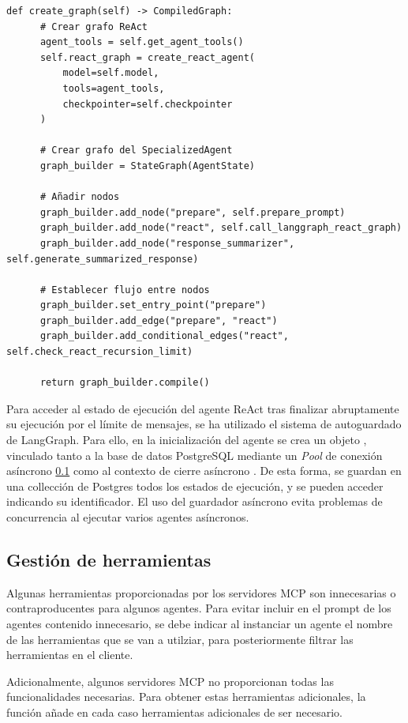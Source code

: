 \begin{lstlisting}[caption={\protect\opus{create_graph: Grafo de agentes especializados} },label={lst:spec_graph}]
  def create_graph(self) -> CompiledGraph:
      # Crear grafo ReAct
      agent_tools = self.get_agent_tools()
      self.react_graph = create_react_agent(
          model=self.model,
          tools=agent_tools,
          checkpointer=self.checkpointer
      )

      # Crear grafo del SpecializedAgent
      graph_builder = StateGraph(AgentState)

      # Añadir nodos 
      graph_builder.add_node("prepare", self.prepare_prompt)
      graph_builder.add_node("react", self.call_langgraph_react_graph)
      graph_builder.add_node("response_summarizer", self.generate_summarized_response)

      # Establecer flujo entre nodos 
      graph_builder.set_entry_point("prepare")
      graph_builder.add_edge("prepare", "react")
      graph_builder.add_conditional_edges("react", self.check_react_recursion_limit)

      return graph_builder.compile()
\end{lstlisting}

Para acceder al estado de ejecución del agente ReAct tras finalizar abruptamente su ejecución por el límite de mensajes, se ha utilizado el sistema de autoguardado de LangGraph. Para ello, en la inicialización del agente se crea un objeto , vinculado tanto a la base de datos PostgreSQL mediante un \textit{Pool} de conexión asíncrono \ref{} como al contexto de cierre asíncrono . De esta forma, se guardan en una collección de Postgres todos los estados de ejecución, y se pueden acceder indicando su identificador. El uso del guardador asíncrono evita problemas de concurrencia al ejecutar varios agentes asíncronos. 

\subsection{Gestión de herramientas}

Algunas herramientas proporcionadas por los servidores MCP son innecesarias o contraproducentes para algunos agentes. Para evitar incluir en el prompt de los agentes contenido innecesario, se debe indicar al instanciar un agente el nombre de las herramientas que se van a utilziar, para posteriormente filtrar las herramientas en el cliente. 

Adicionalmente, algunos servidores MCP no proporcionan todas las funcionalidades necesarias. Para obtener estas herramientas adicionales, la función  añade en cada caso herramientas adicionales de ser necesario. 

